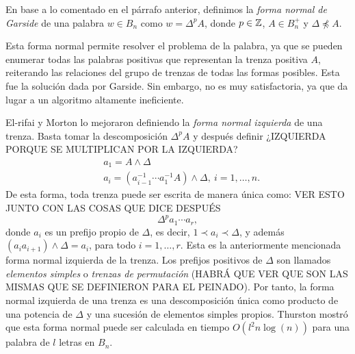 \documentclass[TFG.tex]{subfiles}
\begin{document}
\begin{defi}
En base a lo comentado en el párrafo anterior, definimos la \emph{forma normal de Garside} de una palabra $w\in B_n$ como $w=\Delta^pA$, donde $p\in\mathbb{Z}$, $A\in B_n^+$ y $\Delta\not\preccurlyeq A$. 
\end{defi}


Esta forma normal permite resolver el problema de la palabra, ya que se pueden enumerar todas las palabras positivas que representan la trenza positiva $A$, reiterando las relaciones del grupo de trenzas de todas las formas posibles. Esta fue la solución dada por Garside. Sin embargo, no es muy satisfactoria, ya que da lugar a un algoritmo altamente ineficiente.


El-rifai y Morton \cite{EM} lo mejoraron definiendo la \emph{forma normal izquierda} de una trenza. Basta tomar la descomposición $\Delta^pA$ y después definir ¿IZQUIERDA PORQUE SE MULTIPLICAN POR LA IZQUIERDA?
\begin{align*}
&a_1=A\land\Delta\\
&a_i=(a_{i-1}^{-1}\cdots a_1^{-1}A)\land\Delta,\ i=1,\dots, n.
\end{align*}
De esta forma, toda trenza puede ser escrita de manera única como: VER ESTO JUNTO CON LAS COSAS QUE DICE DESPUÉS
$$\Delta^p a_1\cdots a_r,$$
donde $a_i$ es un prefijo propio de $\Delta$, es decir, $1\prec a_i\prec\Delta$, y además $(a_ia_{i+1})\land\Delta=a_i$, para todo $i=1,\dots, r$. Esta es la anteriormente mencionada forma normal izquierda de la trenza. Los prefijos positivos de $\Delta$ son llamados \emph{elementos simples} o \emph{trenzas de permutación} (HABRÁ QUE VER QUE SON LAS MISMAS QUE SE DEFINIERON PARA EL PEINADO). Por tanto, la forma normal izquierda de una trenza es una descomposición única como producto de una potencia de $\Delta$ y una sucesión de elementos simples propios. Thurston \cite{Thurston} mostró que esta forma normal puede ser calculada en tiempo $O(l^2n\log(n))$ para una palabra de $l$ letras en $B_n$. 



\begin{ej}
\end{ej}
\end{document}
